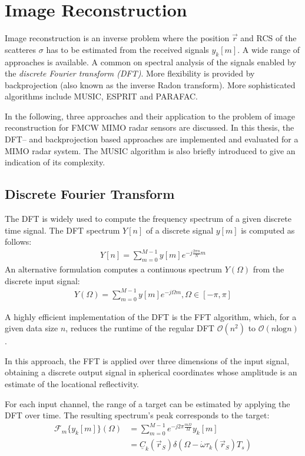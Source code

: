 \section{Image Reconstruction}
Image reconstruction is an inverse problem where the position $\vec r$ and RCS of the scatteres $\sigma$
has to be estimated from the received signals $y_k[m]$.
A wide range of approaches is available.
A common on spectral analysis of the signals enabled by the \emph{discrete Fourier transform (DFT)}.
More flexibility is provided by backprojection (also known as the inverse Radon transform).
More sophisticated algorithms include MUSIC, ESPRIT and PARAFAC.

In the following, three approaches and their application to
the problem of image reconstruction for FMCW MIMO radar sensors are discussed.
In this thesis, the DFT-- and backprojection based approaches
are implemented and evaluated for a MIMO radar system.
The MUSIC algorithm is also briefly introduced to give an indication of its complexity.

\subsection{Discrete Fourier Transform}
\label{ssec:dft_imaging_theory}
The DFT is widely used to compute the frequency spectrum of a given discrete time signal.
The DFT spectrum $Y[n]$ of a discrete signal $y[m]$ is computed as follows:
\begin{align}
    Y[n] = \sum_{m=0}^{M-1}y[m]e^{-j\frac{2\pi n}{N}m}
\end{align}
An alternative formulation computes a continuous spectrum $Y(\Omega)$ 
from the discrete input signal:
\begin{align}
    Y(\Omega) = \sum_{m=0}^{M-1}y[m]e^{-j\Omega m}, \Omega \in [-\pi, \pi]
\end{align}

A highly efficient implementation of the DFT is the FFT algorithm, which,
for a given data size $n$, reduces the runtime of the regular DFT $\mathcal O(n^2)$ to $\mathcal O(n\text{log}n)$ \cite{fft_algorithm}.

In this approach, the FFT is applied over three dimensions of the input signal,
obtaining a discrete output signal in spherical coordinates whose amplitude is an estimate of the locational reflectivity.

For each input channel, the range of a target can be estimated by applying the DFT over time.
The resulting spectrum's peak corresponds to the target:
\begin{align}
    \mathcal{F}_m\{y_k[m]\}(\Omega) & = \sum_{m=0}^{M-1} e^{-j2\pi\frac{m\Omega}{M}} y_k[m]                                       \\
                                    & = \underline C_k(\vec r_S) \delta(\Omega-\dot \omega \tau_k(\vec r_S)T_s) \label{eqn:y_fft}
\end{align}


